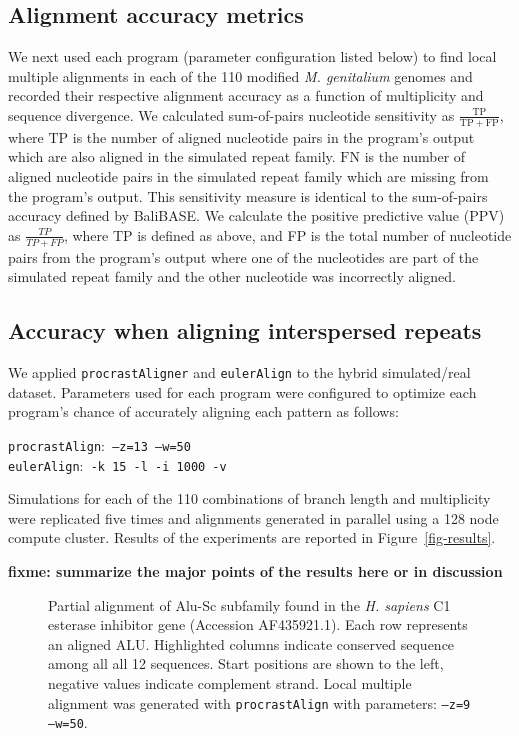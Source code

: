 \documentclass{ws-procs975x65}
\begin{document}
\subsection{Alignment accuracy metrics}
We next used each program (parameter configuration listed below) to find local multiple alignments in each of the 110 modified \emph{M. genitalium} genomes and recorded their respective alignment accuracy as a function of multiplicity and sequence divergence. We calculated sum-of-pairs nucleotide sensitivity as $\frac{\mathrm{TP}}{\mathrm{TP} + \mathrm{FP}}$, where $\mathrm{TP}$ is the number of aligned nucleotide pairs in the program's output which are also aligned in the simulated repeat family.  $\mathrm{FN}$ is the number of aligned nucleotide pairs in the simulated repeat family which are missing from the program's output.  This sensitivity measure is identical to the sum-of-pairs accuracy defined by BaliBASE\cite{ref-balibase}.  We calculate the positive predictive value (PPV) as $\frac{TP}{TP + FP}$, where TP is defined as above, and FP is the total number of nucleotide pairs from the program's output where one of the nucleotides are part of the simulated repeat family and the other nucleotide was incorrectly aligned.

\subsection{Accuracy when aligning interspersed repeats}
We applied \texttt{procrastAligner} and \texttt{eulerAlign} to the hybrid simulated/real dataset.  Parameters used for each program were configured to optimize each program's chance of accurately aligning each pattern as follows:  \begin{center}\texttt{procrastAlign}:\texttt{ --z=13 --w=50 } \\ \texttt{eulerAlign}:\texttt{ -k 15 -l -i 1000 -v}\end{center}
Simulations for each of the 110 combinations of branch length and multiplicity were replicated five times and alignments generated in parallel using a 128 node compute cluster.  Results of the experiments are reported in Figure~\ref{fig-results}.

\textbf{fixme: summarize the major points of the results here or in discussion}

\begin{figure}[t]
\centering {}
\caption{Partial alignment of Alu-Sc subfamily found in the \emph{H. sapiens} C1 esterase inhibitor gene (Accession AF435921.1). Each row represents an aligned ALU. Highlighted columns indicate conserved sequence among all all 12 sequences. Start positions are shown to the left, negative values indicate complement strand.  Local multiple alignment was generated with \texttt{procrastAlign} with parameters: \texttt{--z=9 --w=50}.  }
\label{fig-align}
\end{figure}
\end{document}
